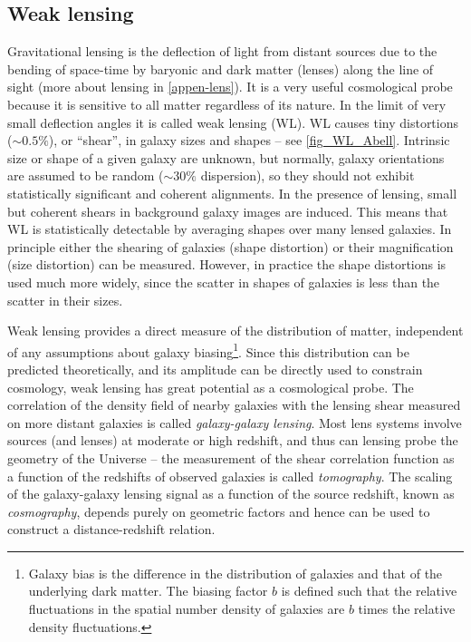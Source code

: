 \subsection{Weak lensing}
Gravitational lensing is the deflection of light from distant sources due to the bending of space-time by baryonic and dark matter (lenses) along the line of sight (more about lensing in \autoref{appen-lens}). It is a very useful cosmological probe because it is sensitive to all matter regardless of its nature. In the limit of very small deflection angles it is called weak lensing (WL). WL causes tiny distortions ($\sim0.5\%$), or ``shear'', in galaxy sizes and shapes -- see \autoref{fig_WL_Abell}. Intrinsic size or shape of a given galaxy are unknown, but normally, galaxy orientations are assumed to be random ($\sim30\%$ dispersion), so they should not exhibit statistically significant and coherent alignments. In the presence of lensing, small but coherent shears in background galaxy images are induced. This means that WL is statistically detectable by averaging shapes over many lensed galaxies. In principle either the shearing of galaxies (shape distortion) or their magnification (size distortion) can be measured. However, in practice the shape distortions is used much more widely, since the scatter in shapes of galaxies is less than the scatter in their sizes.

Weak lensing provides a direct measure of the distribution of matter, independent of any assumptions about galaxy biasing\footnote{Galaxy bias is the difference in the distribution of galaxies and that of the underlying dark matter. The biasing factor $b$ is defined such that the relative fluctuations in the spatial number density of galaxies are $b$ times the relative density fluctuations.}. Since this distribution can be predicted theoretically, and its amplitude can be directly used to constrain cosmology, weak lensing has great potential as a cosmological probe. The correlation of the density field of nearby galaxies with the lensing shear measured on more distant galaxies is called \textit{galaxy-galaxy lensing}. Most lens systems involve sources (and lenses) at moderate or high redshift, and thus can lensing probe the geometry of the Universe -- the measurement of the shear correlation function as a function of the redshifts of observed galaxies is called \textit{tomography}. The scaling of the galaxy-galaxy lensing signal as a function of the source redshift, known as \textit{cosmography}, depends purely on geometric factors and hence can be used to construct a distance-redshift relation.
